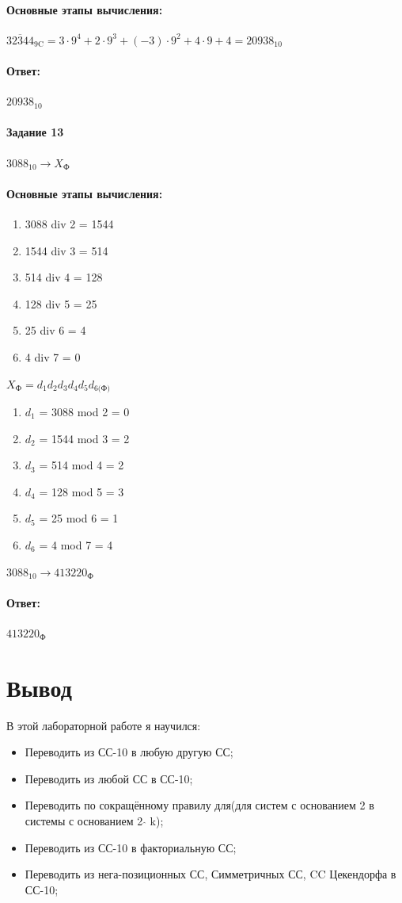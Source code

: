 \documentclass[12pt,onecolumn]{article}
\begin{document}
\paragraph{Основные этапы вычисления:}
\hfill \break

$32\overline{3}44_\text{9C} = 3\cdot9^{4}+2\cdot9^{3}+(-3)\cdot9^{2}+4\cdot9+4=20938_{10}$

\paragraph{Ответ:}
$20938_{10}$

\paragraph{Задание 13}
$3088_{10} \rightarrow X_\text{Ф}$

\paragraph{Основные этапы вычисления:}
\hfill \break
\begin{enumerate}
\item 3088 div 2 = 1544
\item 1544 div 3 = 514
\item 514 div 4 = 128
\item 128 div 5 = 25
\item 25 div 6 = 4
\item 4 div 7 = 0
\end{enumerate}
$X_\text{Ф} = d_1d_2d_3d_4d_5d_\text{6(Ф)}$
\begin{enumerate}
\item $d_{1}$ = 3088 mod 2 = 0
\item $d_{2}$ = 1544 mod 3 = 2
\item $d_{3}$ = 514 mod 4 = 2
\item $d_{4}$ = 128 mod 5 = 3
\item $d_{5}$ = 25 mod 6 = 1
\item $d_{6}$ = 4 mod 7 = 4
\end{enumerate}
$3088_{10} \rightarrow 413220_\text{Ф}$

\paragraph{Ответ:}
$413220_\text{Ф}$
\section{Вывод}
В этой лабораторной работе я научился:
\begin{itemize}
\item Переводить из СС-10 в любую другую СС;
\item Переводить из любой СС в СС-10;
\item Переводить по сокращённому правилу для(для систем с основанием 2 в системы с основанием 2 $\widehat{}$ k);
\item Переводить из СС-10 в факториальную СС;
\item Переводить из нега-позиционных СС, Симметричных СС, CC Цекендорфа в СС-10;
\end{itemize}
\end{document}
